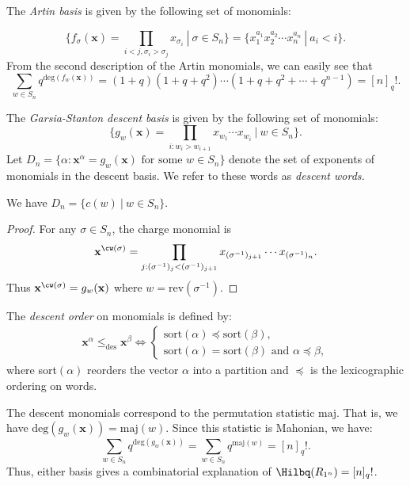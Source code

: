 The \textit{Artin basis} is given by the following set of monomials:

\[\{f_\sigma(\mathbf{x}) = \prod_{i<j, \sigma_i > \sigma_j} x_{\sigma_i} \  | \ \sigma \in S_n \} = \{x_1^{a_1}x_2^{a_2}\cdots x_n^{a_n} \ | \ a_i < i\}.\]
From the second description of the Artin monomials, we can easily see that \[\sum_{w\in S_n}q^{\text{deg}(f_w(\mathbf{x}))} = (1+q)(1+q+q^2) \cdots (1+q+q^2+\cdots + q^{n-1}) = [n]_q!.\]

The \textit{Garsia-Stanton descent basis} is given by the following set of monomials:
\[\{g_w (\mathbf{x}) = \prod_{i:w_i > w_{i+1}} x_{w_1} \cdots x_{w_i} \ | \ w \in S_n\}.\]
Let $D_n = \{\alpha : \mathbf{x}^{\alpha} = g_w(\mathbf{x}) \text{ for some } w \in S_n\}$ denote the set of exponents of monomials in the descent basis. We refer to these words as \textit{descent words.} 
\begin{lemma}\label{lemma:charge and majt}
    We have $D_n = \{c(w) \ | \ w \in S_n\}.$
\end{lemma}
\begin{proof}
    For any $\sigma\in S_n$, the charge monomial is  \[\mathbf{x}^{\cw(\sigma)} = \prod_{j:(\sigma^{-1})_{j} < (\sigma^{-1})_{j+1}} x_{(\sigma^{-1})_{j+1}} \cdots x_{(\sigma^{-1})_n}.\]
Thus $\mathbf{x}^{\cw(\sigma)} = g_w(\mathbf{x})$ where $w = \text{rev}(\sigma^{-1})$. 
\end{proof}

The \textit{descent order} on monomials is defined by:
\begin{align}\label{eq:descent order}
    \mathbf{x}^{\alpha} \leq_{\text{des}}\mathbf{x}^{\beta} \Leftrightarrow \begin{cases}
    \text{sort}(\alpha) \preceq \text{sort}(\beta),  \\ \text{sort}(\alpha) = \text{sort}(\beta) \text{ and } \alpha \preceq \beta,
\end{cases}
\end{align}
where sort$(\alpha)$ reorders the vector $\alpha$ into a partition and $\preceq$ is the lexicographic ordering on words.

The descent monomials correspond to the permutation statistic $\text{maj}$. That is, we have $\text{deg}(g_w(\mathbf{x})) = \text{maj}(w)$. 
Since this statistic is Mahonian, we have:
 \[\sum\limits_{w\in S_n} q^{\text{deg}(g_{w}(\mathbf{x}))} = \sum\limits_{w\in S_n} q^{\text{maj}(w)} = [n]_q!.\]
Thus, either basis gives a combinatorial explanation of $\Hilbq(R_{1^n}) = [n]_q!$. 

